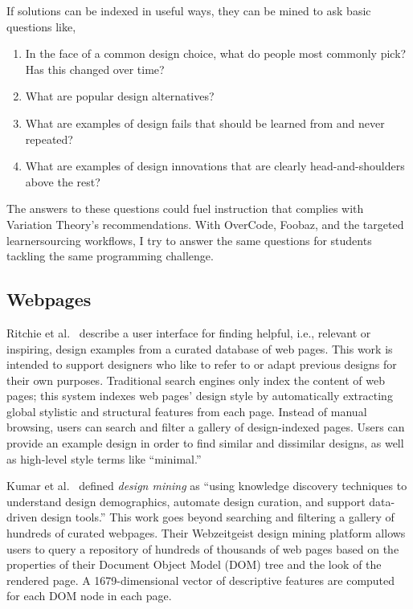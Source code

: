 If solutions can be indexed in useful ways, they can be mined to ask basic questions like,
\begin{enumerate}
\item    In the face of a common design choice, what do people most commonly pick? Has this changed over time?
\item    What are popular design alternatives?
\item    What are examples of design fails that should be learned from and never repeated?
\item    What are examples of design innovations that are clearly head-and-shoulders above the rest?
\end{enumerate}
The answers to these questions could fuel instruction that complies with Variation Theory's recommendations. With OverCode, Foobaz, and the targeted learnersourcing workflows, I try to answer the same questions for students tackling the same programming challenge.

\subsection{Webpages}
Ritchie et al.~\cite{ritchie2011d} describe a user interface for finding helpful, i.e., relevant or inspiring, design examples from a curated database of web pages. This work is intended to support designers who like to refer to or adapt previous designs for their own purposes. Traditional search engines only index the content of web pages; this system indexes web pages’ design style by automatically extracting global stylistic and structural features from each page. Instead of manual browsing, users can search and filter a gallery of design-indexed pages. Users can provide an example design in order to find similar and dissimilar designs, as well as high-level style terms like ``minimal.''

Kumar et al.~\cite{webzeitgeist} defined {\it design mining} as ``using knowledge discovery techniques to understand design demographics, automate design curation, and support data-driven design tools.'' This work goes beyond searching and filtering a gallery of hundreds of curated webpages. Their Webzeitgeist design mining platform allows users to query a repository of hundreds of thousands of web pages based on the properties of their Document Object Model (DOM) tree and the look of the rendered page. A 1679-dimensional vector of descriptive features are computed for each DOM node in each page.

